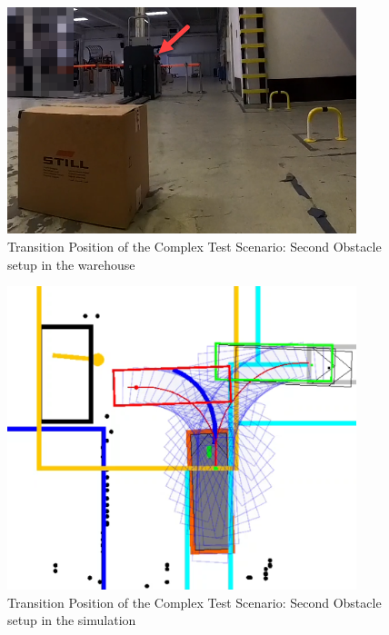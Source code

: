 \begin{figure}[H]
    \begin{center}
        \includegraphics[width=4in]{images/Chap3/Test3/Transition_real.png} %
        \caption{Transition Position of the Complex Test Scenario: Second Obstacle setup in the warehouse}
        \label{OptResult20}
        \end{center}    
\end{figure}

\begin{figure}[H]
    \begin{center}
        \includegraphics[width=4in]{images/Chap3/Test3/Transition_simu.png} %
        \caption{Transition Position of the Complex Test Scenario: Second Obstacle setup in the simulation}
        \label{OptResult21}
        \end{center}    
\end{figure}

